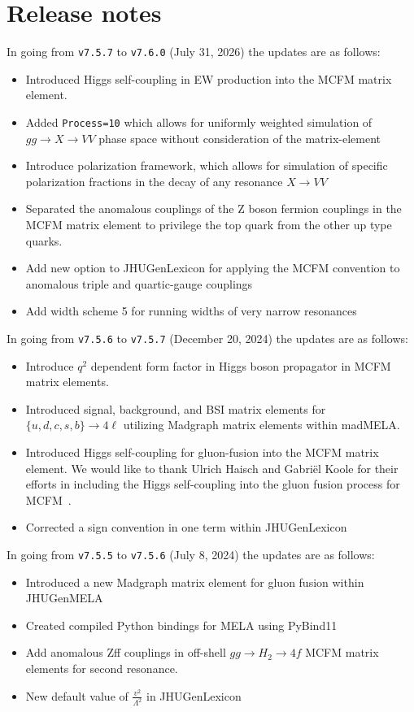 \documentclass[aps,superscriptaddress,nofootinbib]{revtex4}
\begin{document}
\section{Release notes}
\noindent
In going from \verb|v7.5.7| to \verb|v7.6.0| (July 31, 2026) the updates are as follows:
\begin{itemize}
    \item Introduced Higgs self-coupling in EW production into the MCFM matrix element.
    \item Added \verb|Process=10| which allows for uniformly weighted simulation of $gg \to X\to VV$ phase space without consideration of the matrix-element
    \item Introduce polarization framework, which allows for simulation of specific polarization fractions in the decay of any resonance $X\to VV$
    \item Separated the anomalous couplings of the Z boson fermion couplings in the MCFM matrix element to privilege the top quark from the other up type quarks.
    \item Add new option to JHUGenLexicon for applying the MCFM convention to anomalous triple and quartic-gauge couplings 
    \item Add width scheme 5 for running widths of very narrow resonances
\end{itemize}
\noindent
In going from \verb|v7.5.6| to \verb|v7.5.7| (December 20, 2024) the updates are as follows:
\noindent
\begin{itemize}
\item Introduce $q^2$ dependent form factor in Higgs boson propagator in MCFM matrix elements. 
\item Introduced signal, background, and BSI matrix elements for $\{u,d,c,s,b\} \rightarrow 4\ell$ utilizing Madgraph matrix elements within madMELA.
\item Introduced Higgs self-coupling for gluon-fusion into the MCFM matrix element.
We would like to thank Ulrich Haisch and Gabriël Koole for their efforts in including
the Higgs self-coupling into the gluon fusion process for MCFM~\cite{SelfCoupling}.
\item Corrected a sign convention in one term within JHUGenLexicon
\end{itemize}
\noindent
In going from \verb|v7.5.5| to \verb|v7.5.6| (July 8, 2024) the updates are as follows:
\noindent
\begin{itemize}
\item Introduced a new Madgraph matrix element for gluon fusion within JHUGenMELA
\item Created compiled Python bindings for MELA using PyBind11
\item Add anomalous Zff couplings in off-shell $gg\to H_{2} \to 4f$ MCFM matrix elements for second resonance.
\item New default value of $\frac{v^2}{\Lambda^2}$ in JHUGenLexicon
\end{itemize}
\end{document}
